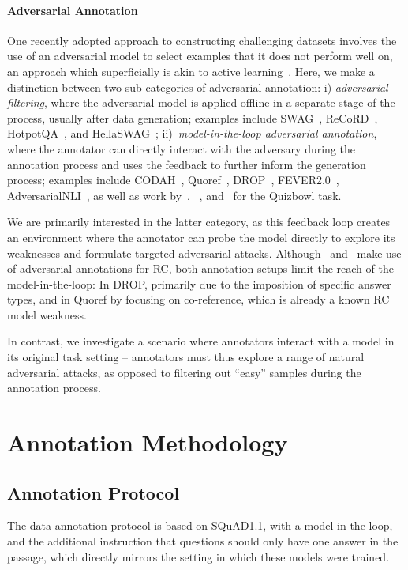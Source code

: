 \documentclass[11pt,a4paper]{article}
\newcommand{\squadone}{SQuAD1.1}
\newcommand{\hotpot}{HotpotQA}
\begin{document}
\paragraph{Adversarial Annotation}{
One recently adopted approach to constructing challenging datasets involves the use of an adversarial model to select examples that it does not perform well on, an approach which superficially is akin to active learning~\cite{lewis1994sequential}.
Here, we make a distinction between two sub-categories of adversarial annotation:
i) \emph{adversarial filtering}, where the adversarial model is applied offline in a separate stage of the process, usually after data generation;
examples include SWAG~\cite{zellers2018swag}, ReCoRD~\cite{zhang2018record}, \hotpot{}~\cite{yang2018hotpotqa}, and HellaSWAG~\cite{zellers-etal-2019-hellaswag};
ii)~\emph{model-in-the-loop adversarial annotation}, where the annotator can directly interact with the adversary during the annotation process and uses the feedback to further inform the generation process;
examples include CODAH~\cite{chen-etal-2019-codah}, Quoref~\cite{dasigi-etal-2019-quoref}, DROP~\cite{dua2019drop}, FEVER2.0~\cite{thorne-etal-2019-fever2}, AdversarialNLI~\cite{nie2019adversarial}, as well as work by~\citet{dinan-etal-2019-build}, ~\citet{Kaushik2020Learning}, and~\citet{wallace-etal-2019-trick} for the Quizbowl task. 


We are primarily interested in the latter category, as this feedback loop creates an environment where the annotator can probe the model directly to explore its weaknesses and formulate targeted adversarial attacks.
Although~\citet{dua2019drop} and~\citet{dasigi-etal-2019-quoref} make use of adversarial annotations for RC, both annotation setups limit the reach of the model-in-the-loop: 
In DROP, primarily due to the imposition of specific answer types, and in Quoref by focusing on co-reference, which is already a known RC model weakness.


In contrast, we investigate a scenario where annotators interact with a model in its original task setting -- annotators must thus explore a range of natural adversarial attacks, as opposed to filtering out ``easy'' samples during the annotation process.
}

\section{Annotation Methodology}

\subsection{Annotation Protocol}
The data annotation protocol is based on \squadone{}, with a model in the loop, and the additional instruction that questions should only have one answer in the passage, which directly mirrors the setting in which these models were trained.
\end{document}

